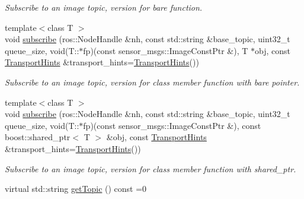 \begin{DoxyCompactItemize}
\begin{DoxyCompactList}\small\item\em Subscribe to an image topic, version for bare function. \end{DoxyCompactList}\item 
\hypertarget{classimage__transport_1_1_subscriber_plugin_a9cd92f4bac80d9f89d949082581ad4fe}{{\footnotesize template$<$class T $>$ }\\void \hyperlink{classimage__transport_1_1_subscriber_plugin_a9cd92f4bac80d9f89d949082581ad4fe}{subscribe} (ros\-::\-Node\-Handle \&nh, const std\-::string \&base\-\_\-topic, uint32\-\_\-t queue\-\_\-size, void(T\-::$\ast$fp)(const sensor\-\_\-msgs\-::\-Image\-Const\-Ptr \&), T $\ast$obj, const \hyperlink{classimage__transport_1_1_transport_hints}{Transport\-Hints} \&transport\-\_\-hints=\hyperlink{classimage__transport_1_1_transport_hints}{Transport\-Hints}())}\label{classimage__transport_1_1_subscriber_plugin_a9cd92f4bac80d9f89d949082581ad4fe}

\begin{DoxyCompactList}\small\item\em Subscribe to an image topic, version for class member function with bare pointer. \end{DoxyCompactList}\item 
\hypertarget{classimage__transport_1_1_subscriber_plugin_acb23bea81d54ee21cd5fa12ddd871aaa}{{\footnotesize template$<$class T $>$ }\\void \hyperlink{classimage__transport_1_1_subscriber_plugin_acb23bea81d54ee21cd5fa12ddd871aaa}{subscribe} (ros\-::\-Node\-Handle \&nh, const std\-::string \&base\-\_\-topic, uint32\-\_\-t queue\-\_\-size, void(T\-::$\ast$fp)(const sensor\-\_\-msgs\-::\-Image\-Const\-Ptr \&), const boost\-::shared\-\_\-ptr$<$ T $>$ \&obj, const \hyperlink{classimage__transport_1_1_transport_hints}{Transport\-Hints} \&transport\-\_\-hints=\hyperlink{classimage__transport_1_1_transport_hints}{Transport\-Hints}())}\label{classimage__transport_1_1_subscriber_plugin_acb23bea81d54ee21cd5fa12ddd871aaa}

\begin{DoxyCompactList}\small\item\em Subscribe to an image topic, version for class member function with shared\-\_\-ptr. \end{DoxyCompactList}\item 
\hypertarget{classimage__transport_1_1_subscriber_plugin_abb289f564cb993a990626662e65bd9f6}{virtual std\-::string \hyperlink{classimage__transport_1_1_subscriber_plugin_abb289f564cb993a990626662e65bd9f6}{get\-Topic} () const =0}\label{classimage__transport_1_1_subscriber_plugin_abb289f564cb993a990626662e65bd9f6}


\end{DoxyCompactItemize}
